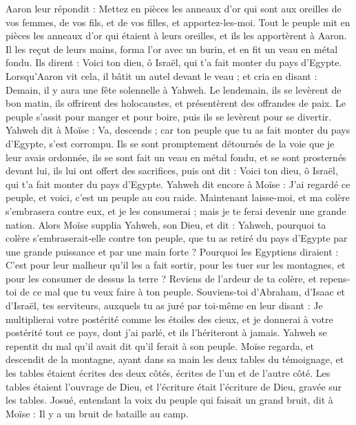 \begin{multicols}{2}
Aaron leur répondit : Mettez en pièces les anneaux d'or qui sont aux oreilles de vos femmes, de vos fils, et de vos filles, et apportez-les-moi\FTNT{}.
Tout le peuple mit en pièces les anneaux d'or qui étaient à leurs oreilles, et ils les apportèrent à Aaron.
Il les reçut de leurs mains, forma l'or avec un burin, et en fit un veau\FTNT{} en métal fondu. Ils dirent : Voici ton dieu, ô Israël, qui t'a fait monter du pays d'Egypte.
Lorsqu’Aaron vit cela, il bâtit un autel devant le veau ; et cria en disant : Demain, il y aura une fête solennelle à Yahweh.
Le lendemain, ils se levèrent de bon matin, ils offrirent des holocaustes, et présentèrent des offrandes de paix. Le peuple s'assit pour manger et pour boire, puis ils se levèrent pour se divertir\FTNT{}.
Yahweh dit à Moïse : Va, descends ; car ton peuple que tu as fait monter du pays d'Egypte, s'est corrompu\FTNT{}.
Ils se sont promptement détournés de la voie que je leur avais ordonnée, ils se sont fait un veau en métal fondu, et se sont prosternés devant lui, ils lui ont offert des sacrifices, puis ont dit : Voici ton dieu, ô Israël, qui t'a fait monter du pays d'Egypte\FTNT{}.
Yahweh dit encore à Moïse : J'ai regardé ce peuple, et voici, c'est un peuple au cou raide.
Maintenant laisse-moi, et ma colère s'embrasera contre eux, et je les consumerai ; mais je te ferai devenir une grande nation.
Alors Moïse supplia Yahweh, son Dieu, et dit : Yahweh, pourquoi ta colère s'embraserait-elle contre ton peuple, que tu as retiré du pays d'Egypte par une grande puissance et par une main forte\FTNT{} ?
Pourquoi les Egyptiens diraient : C’est pour leur malheur qu’il les a fait sortir, pour les tuer sur les montagnes, et pour les consumer de dessus la terre ? Reviens de l'ardeur de ta colère, et repens-toi de ce mal que tu veux faire à ton peuple\FTNT{}.
Souviens-toi d'Abraham, d'Isaac et d'Israël, tes serviteurs, auxquels tu as juré par toi-même en leur disant : Je multiplierai votre postérité comme les étoiles des cieux, et je donnerai à votre postérité tout ce pays, dont j'ai parlé, et ils l'hériteront à jamais\FTNT{}.
Yahweh se repentit du mal qu'il avait dit qu'il ferait à son peuple.
Moïse regarda, et descendit de la montagne, ayant dans sa main les deux tables du témoignage, et les tables étaient écrites des deux côtés, écrites de l’un et de l’autre côté.
Les tables étaient l'ouvrage de Dieu, et l'écriture était l'écriture de Dieu, gravée sur les tables.
Josué, entendant la voix du peuple qui faisait un grand bruit, dit à Moïse : Il y a un bruit de bataille au camp.

\end{multicols}
